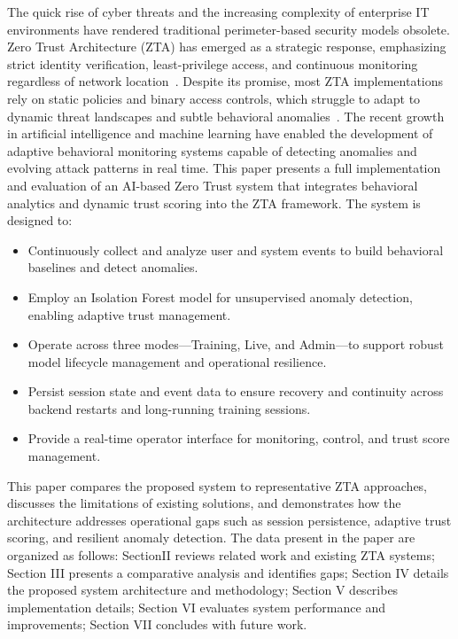 \documentclass[conference]{IEEEtran}
\begin{document}
The quick rise of cyber threats and the increasing
complexity of enterprise IT environments have rendered
traditional perimeter-based security models obsolete. Zero
Trust Architecture (ZTA) has emerged as a strategic response,
emphasizing strict identity verification, least-privilege access,
and continuous monitoring regardless of network location~\cite{nist800207}. Despite its promise, most ZTA implementations rely on static
policies and binary access controls, which struggle to adapt to
dynamic threat landscapes and subtle behavioral anomalies~\cite{rose2020zero, yu2021survey}. The recent growth in artificial intelligence and machine
learning have enabled the development of adaptive
behavioral monitoring systems capable of detecting anomalies
and evolving attack patterns in real time.
This paper presents a full implementation and evaluation
of an AI-based Zero Trust system that integrates behavioral
analytics and dynamic trust scoring into the ZTA framework.
The system is designed to:
\begin{itemize}[leftmargin=*]
  \item Continuously collect and analyze user and system events to
build behavioral baselines and detect anomalies.
  \item Employ an Isolation Forest model for unsupervised anomaly
detection, enabling adaptive trust management.
  \item Operate across three modes—Training, Live, and Admin—to
support robust model lifecycle management and operational
resilience.
  \item Persist session state and event data to ensure recovery and
continuity across backend restarts and long-running training
sessions.
  \item Provide a real-time operator interface for monitoring, control,
and trust score management.
\end{itemize}

This paper compares the proposed system to representative ZTA approaches, discusses the limitations of existing solutions, and demonstrates how the architecture addresses operational gaps such as session persistence, adaptive trust scoring, and resilient anomaly detection. The data present in the paper are organized as follows:  
SectionII reviews related work and existing ZTA systems;
Section III presents a comparative analysis and identifies
gaps; Section IV details the proposed system architecture
and methodology; Section V describes implementation details;
Section VI evaluates system performance and improvements;
Section VII concludes with future work.
\end{document}
